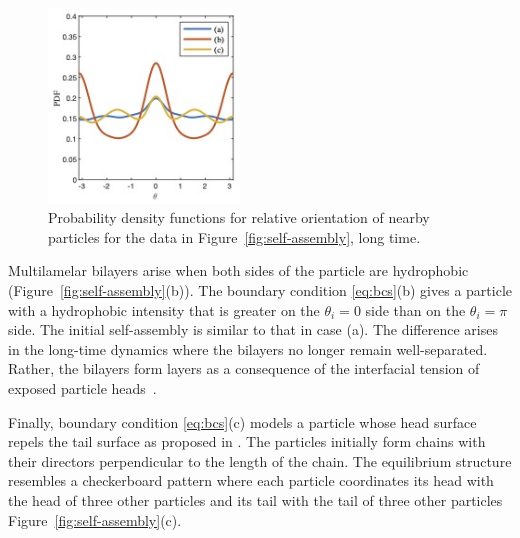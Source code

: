 \begin{figure}
  \vspace{-4pt}
  \centering
  \includegraphics[width=2in]{figures/SpecificAim1/OrderPDFs.jpg} 
  \vspace{-20pt}
  \caption{\footnotesize
    \label{fig:OrderPDFs}
    Probability density functions for
    relative orientation of nearby particles
    for the data in 
    Figure~\ref{fig:self-assembly}, long time.
  }
\end{figure}
Multilamelar bilayers arise when both sides of the particle
are hydrophobic (Figure~\ref{fig:self-assembly}(b)).
The boundary condition \eqref{eq:bcs}(b) 
gives a particle with a hydrophobic intensity that is greater
on the $\theta_i = 0$ side than on the $\theta_i = \pi$ side.
The initial self-assembly is similar to that in case (a).
The difference arises in the long-time dynamics where the bilayers
no longer remain well-separated. 
Rather, the bilayers form layers 
as a consequence of the interfacial tension of exposed particle
heads~\cite{Huetal19, deMeetal21}. 


Finally, boundary condition \eqref{eq:bcs}(c) models 
a particle whose head surface repels the tail surface as proposed in
\cite{MaRa76, Ma77}.
The particles initially form chains with their directors perpendicular to the
length of the chain. The equilibrium structure
resembles a checkerboard pattern
where each particle coordinates
its head with the head of three other particles and its tail with the
tail of three other particles Figure~\ref{fig:self-assembly}(c).



